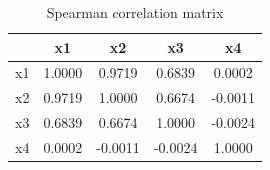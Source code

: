 \begin{table}[h]
\centering
\begin{tabular}{|l|c|c|c|c|}
\hline
 & x1 & x2 & x3 & x4 \\
\hline
x1 & 1.0000 & 0.9719 & 0.6839 & 0.0002 \\
\hline
x2 & 0.9719 & 1.0000 & 0.6674 & -0.0011 \\
\hline
x3 & 0.6839 & 0.6674 & 1.0000 & -0.0024 \\
\hline
x4 & 0.0002 & -0.0011 & -0.0024 & 1.0000 \\
\hline
\end{tabular}
\caption{Spearman correlation matrix}
\label{tab:spearman}
\end{table}